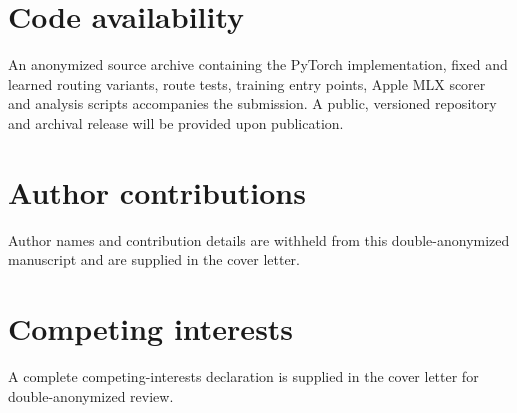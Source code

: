 \documentclass[11pt]{article}
\begin{document}
\section*{Code availability}

An anonymized source archive containing the PyTorch implementation, fixed and learned routing variants, route tests, training entry points, Apple MLX scorer and analysis scripts accompanies the submission. A public, versioned repository and archival release will be provided upon publication.

\section*{Author contributions}

Author names and contribution details are withheld from this double-anonymized manuscript and are supplied in the cover letter.

\section*{Competing interests}

A complete competing-interests declaration is supplied in the cover letter for double-anonymized review.



\end{document}
